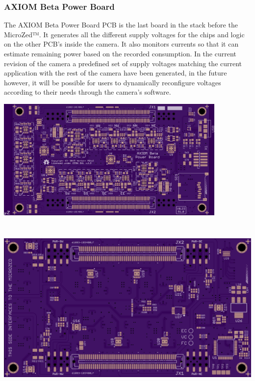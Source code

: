 \subsubsection{AXIOM Beta Power Board}

The AXIOM Beta Power Board PCB is the last board in the stack before the MicroZed™. It generates all the different supply voltages for the chips and logic on the other PCB’s inside the camera. It also monitors currents so that it can estimate remaining power based on the recorded consumption. In the current revision of the camera a predefined set of supply voltages matching the current application with the rest of the camera have been generated, in the future however, it will be possible for users to dynamically reconfigure voltages according to their needs through the camera’s software. 

\begin{center}
\includegraphics[height=6cm]{images/Beta_Power_Test_v0.11-top}
\end{center}

\begin{center}
\includegraphics[height=9cm]{images/Beta_Power_Test_v0.11-bottom}
\end{center}

